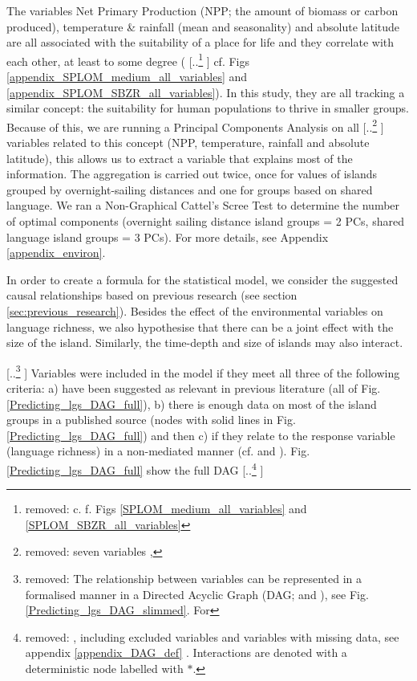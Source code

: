 \documentclass[unnumsec,webpdf,modern,medium]{oup-authoring-template}
\providecommand{\DIFaddtex}[1]{{\protect\color{blue} \sf #1}} %
\providecommand{\DIFdeltex}[1]{{\protect\color{red} [..\footnote{removed: #1} ]}} %
\providecommand{\DIFaddbegin}{} %
\providecommand{\DIFaddend}{} %
\providecommand{\DIFdelbegin}{} %
\providecommand{\DIFdelend}{} %
\providecommand{\DIFadd}[1]{\texorpdfstring{\DIFaddtex{#1}}{#1}} %
\providecommand{\DIFdel}[1]{\texorpdfstring{\DIFdeltex{#1}}{}} %
\newcommand{\DIFscaledelfig}{0.5}
\newlength{\DIFdelgraphicswidth} %
\newlength{\DIFdelgraphicsheight} %
\newcommand{\DIFaddincludegraphics}[2][]{{\color{blue}\fbox{\DIFOincludegraphics[#1]{#2}}}} %
\newcommand{\DIFdelincludegraphics}[2][]{%
\sbox{\DIFdelgraphicsbox}{\DIFOincludegraphics[#1]{#2}}%
\settoboxwidth{\DIFdelgraphicswidth}{\DIFdelgraphicsbox} %
\settoboxtotalheight{\DIFdelgraphicsheight}{\DIFdelgraphicsbox} %
\scalebox{\DIFscaledelfig}{%
\parbox[b]{\DIFdelgraphicswidth}{\usebox{\DIFdelgraphicsbox}\\[-\baselineskip] \rule{\DIFdelgraphicswidth}{0em}}\llap{\resizebox{\DIFdelgraphicswidth}{\DIFdelgraphicsheight}{%
\setlength{\unitlength}{\DIFdelgraphicswidth}%
\begin{picture}(1,1)%
\thicklines\linethickness{2pt} %
{\color[rgb]{1,0,0}\put(0,0){\framebox(1,1){}}}%
{\color[rgb]{1,0,0}\put(0,0){\line( 1,1){1}}}%
{\color[rgb]{1,0,0}\put(0,1){\line(1,-1){1}}}%
\end{picture}%
}\hspace*{3pt}}} %
} %
\DeclareRobustCommand{\DIFaddbegin}{\DIFOaddbegin \let\includegraphics\DIFaddincludegraphics} %
\DeclareRobustCommand{\DIFaddend}{\DIFOaddend \let\includegraphics\DIFOincludegraphics} %
\DeclareRobustCommand{\DIFdelbegin}{\DIFOdelbegin \let\includegraphics\DIFdelincludegraphics} %
\DeclareRobustCommand{\DIFdelend}{\DIFOaddend \let\includegraphics\DIFOincludegraphics} %
\begin{document}
\DIFdelend The variables Net Primary Production (NPP; the amount of biomass or carbon produced), temperature \& rainfall (mean and seasonality) and absolute latitude are all associated with the suitability of a place for life and they correlate with each other, at least to some degree (\DIFdelbegin \DIFdel{c. f. Figs \ref{SPLOM_medium_all_variables} and \ref{SPLOM_SBZR_all_variables}}\DIFdelend \DIFaddbegin \DIFadd{cf. Figs \ref{appendix_SPLOM_medium_all_variables} and \ref{appendix_SPLOM_SBZR_all_variables}}\DIFaddend ). In this study, they are all tracking a similar concept: the suitability for human populations to thrive in smaller groups. Because of this, we are running a Principal Components Analysis on all \DIFdelbegin \DIFdel{seven variables , }\DIFdelend \DIFaddbegin \DIFadd{variables related to this concept (NPP, temperature, rainfall and absolute latitude), }\DIFaddend this allows us to extract a variable that explains most of the information. \DIFaddbegin \DIFadd{The aggregation is carried out twice, once for values of islands grouped by overnight-sailing distances and one for groups based on shared language. }\DIFaddend We ran a Non-Graphical Cattel's Scree Test \citep{cattell1966scree, R-nFactors} to determine the number of optimal components (overnight sailing distance island groups = 2 PCs, shared language island groups = 3 PCs). For more details, see Appendix \ref{appendix_environ}.

In order to create a formula for the statistical model, we consider the suggested causal relationships based on previous research (see section \ref{sec:previous_research}). Besides the effect of the environmental variables on language richness, we also hypothesise that there can be a joint effect with the size of the island. Similarly, the time-depth and size of islands may also interact. 

\DIFdelbegin \DIFdel{The relationship between variables can be represented in a formalised manner in a Directed Acyclic Graph (DAG; \citet{pearl1995causal} and \citet{mcelreath2020statistical}), see Fig. \ref{Predicting_lgs_DAG_slimmed}. For }\DIFdelend \DIFaddbegin \DIFadd{Variables were included in the model if they meet all three of the following criteria: a) have been suggested as relevant in previous literature (all of Fig. \ref{Predicting_lgs_DAG_full}), b) there is enough data on most of the island groups in a published source (nodes with solid lines in Fig. \ref{Predicting_lgs_DAG_full}) and then c) if they relate to the response variable (language richness) in a non-mediated manner (cf. \citet{pearl1995causal} and \citet{cinelli_et_al_2022}). Fig. \ref{Predicting_lgs_DAG_full} show }\DIFaddend the full DAG \DIFdelbegin \DIFdel{, including excluded variables and variables with missing data, see appendix \ref{appendix_DAG_def} . Interactions are denoted with a deterministic node labelled with $\ast$. 
}%
\end{document}
